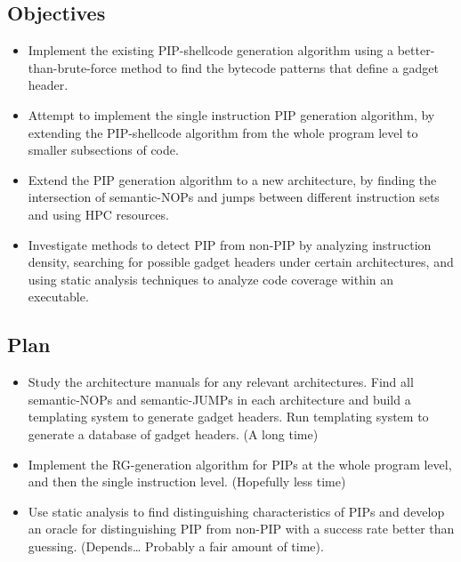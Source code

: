 \subsection{Objectives}

\begin{itemize}
\item
  Implement the existing PIP-shellcode generation algorithm using a
  better-than-brute-force method to find the bytecode patterns that
  define a gadget header.
\item
  Attempt to implement the single instruction PIP generation algorithm,
  by extending the PIP-shellcode algorithm from the whole program level
  to smaller subsections of code.
\item
  Extend the PIP generation algorithm to a new architecture, by finding
  the intersection of semantic-NOPs and jumps between different
  instruction sets and using HPC resources.
\item
  Investigate methods to detect PIP from non-PIP by analyzing
  instruction density, searching for possible gadget headers under
  certain architectures, and using static analysis techniques to analyze
  code coverage within an executable.
\end{itemize}
\subsection{Plan}

\begin{itemize}
\item
  Study the architecture manuals for any relevant architectures. Find
  all semantic-NOPs and semantic-JUMPs in each architecture and build a
  templating system to generate gadget headers. Run templating system to
  generate a database of gadget headers. (A long time)
\item
  Implement the RG-generation algorithm for PIPs at the whole program
  level, and then the single instruction level. (Hopefully less time)
\item
  Use static analysis to find distinguishing characteristics of PIPs and
  develop an oracle for distinguishing PIP from non-PIP with a success
  rate better than guessing. (Depends\ldots{} Probably a fair amount of
  time).
\end{itemize}

